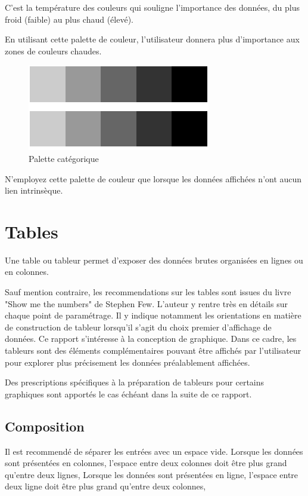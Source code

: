 \documentclass[a4paper,12pt]{article}
\begin{document}
\begin{multicols}{2}
C'est la température des couleurs qui souligne l'importance des données, du plus froid (faible) au plus chaud (élevé). \autocite{REF???}

En utilisant cette palette de couleur, l'utilisateur donnera plus d'importance aux zones de couleurs chaudes. \autocite{REF???}

\begin{figure}[H]
\centering
\includegraphics[width=.9\linewidth]{./img/palette-categorique.pdf}
\caption{\label{fig:org06f2001}Palette catégorique}
\end{figure}

N'employez cette palette de couleur que lorsque les données affichées n'ont aucun lien intrinsèque. \autocite{wilkeColorScales2019}
\section*{Tables}
\label{sec:org17f4c56}
Une table ou tableur permet d'exposer des données brutes organisées en lignes ou en colonnes. \autocite{mikeyiHowChooseRight2020}

Sauf mention contraire, les recommendations sur les tables sont issues du livre "Show me the numbers" de Stephen Few.\autocite{stephenfewShowMeNumbers2012} L'auteur y rentre très en détails sur chaque point de paramétrage. Il y indique notamment les orientations en matière de construction de tableur lorsqu'il s'agit du choix premier d'affichage de données. Ce rapport s'intéresse à la conception de graphique. Dans ce cadre, les tableurs sont des éléments complémentaires pouvant être affichés par l'utilisateur pour explorer plus précisement les données préalablement affichées.

Des prescriptions spécifiques à la préparation de tableurs pour certains graphiques sont apportés le cas échéant dans la suite de ce rapport.
\subsection*{Composition}
\label{sec:orgdedbca5}
Il est recommendé de séparer les entrées avec un espace vide.
Lorsque les données sont présentées en colonnes, l'espace entre deux colonnes doit être plus grand qu'entre deux lignes,
Lorsque les données sont présentées en ligne, l'espace entre deux ligne doit être plus grand qu'entre deux colonnes,


\end{multicols}
\end{document}
